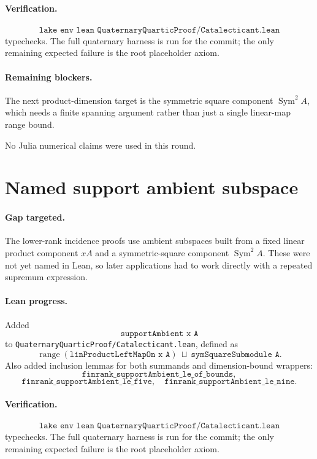 \documentclass[11pt]{article}
\begin{document}
\paragraph{Verification.}
\[
\texttt{lake env lean QuaternaryQuarticProof/Catalecticant.lean}
\]
typechecks.  The full quaternary harness is run for the commit; the only
remaining expected failure is the root placeholder axiom.

\paragraph{Remaining blockers.}
The next product-dimension target is the symmetric square component
\(\operatorname{Sym}^2 A\), which needs a finite spanning argument rather than
just a single linear-map range bound.

No Julia numerical claims were used in this round.

\section*{Named support ambient subspace}

\paragraph{Gap targeted.}
The lower-rank incidence proofs use ambient subspaces built from a fixed
linear product component \(xA\) and a symmetric-square component
\(\operatorname{Sym}^2 A\).  These were not yet named in Lean, so later
applications had to work directly with a repeated supremum expression.

\paragraph{Lean progress.}
Added
\[
\texttt{supportAmbient x A}
\]
to \texttt{QuaternaryQuarticProof/Catalecticant.lean}, defined as
\[
\operatorname{range}(\texttt{linProductLeftMapOn x A})\ \sqcup\
\texttt{symSquareSubmodule A}.
\]
Also added inclusion lemmas for both summands and dimension-bound wrappers:
\[
\texttt{finrank\_supportAmbient\_le\_of\_bounds},
\]
\[
\texttt{finrank\_supportAmbient\_le\_five},\quad
\texttt{finrank\_supportAmbient\_le\_nine}.
\]

\paragraph{Verification.}
\[
\texttt{lake env lean QuaternaryQuarticProof/Catalecticant.lean}
\]
typechecks.  The full quaternary harness is run for the commit; the only
remaining expected failure is the root placeholder axiom.
\end{document}
